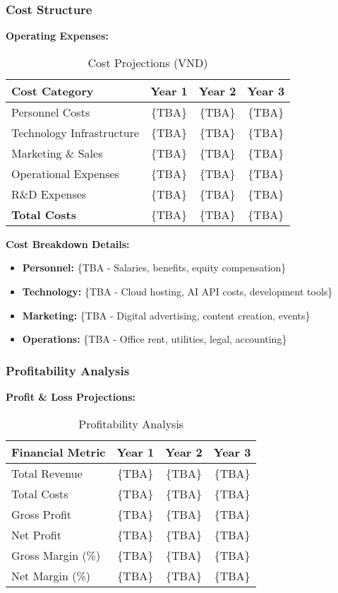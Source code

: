 \subsubsection{Cost Structure}
\textbf{Operating Expenses:}
\begin{table}[h]
\centering
\begin{tabular}{|l|c|c|c|}
\hline
\textbf{Cost Category} & \textbf{Year 1} & \textbf{Year 2} & \textbf{Year 3} \\
\hline
Personnel Costs & \{TBA\} & \{TBA\} & \{TBA\} \\
Technology Infrastructure & \{TBA\} & \{TBA\} & \{TBA\} \\
Marketing \& Sales & \{TBA\} & \{TBA\} & \{TBA\} \\
Operational Expenses & \{TBA\} & \{TBA\} & \{TBA\} \\
R\&D Expenses & \{TBA\} & \{TBA\} & \{TBA\} \\
\hline
\textbf{Total Costs} & \{TBA\} & \{TBA\} & \{TBA\} \\
\hline
\end{tabular}
\caption{Cost Projections (VND)}
\end{table}

\textbf{Cost Breakdown Details:}
\begin{itemize}
    \item \textbf{Personnel:} \{TBA - Salaries, benefits, equity compensation\}
    \item \textbf{Technology:} \{TBA - Cloud hosting, AI API costs, development tools\}
    \item \textbf{Marketing:} \{TBA - Digital advertising, content creation, events\}
    \item \textbf{Operations:} \{TBA - Office rent, utilities, legal, accounting\}
\end{itemize}

\subsubsection{Profitability Analysis}
\textbf{Profit \& Loss Projections:}
\begin{table}[h]
\centering
\begin{tabular}{|l|c|c|c|}
\hline
\textbf{Financial Metric} & \textbf{Year 1} & \textbf{Year 2} & \textbf{Year 3} \\
\hline
Total Revenue & \{TBA\} & \{TBA\} & \{TBA\} \\
Total Costs & \{TBA\} & \{TBA\} & \{TBA\} \\
\hline
Gross Profit & \{TBA\} & \{TBA\} & \{TBA\} \\
Net Profit & \{TBA\} & \{TBA\} & \{TBA\} \\
\hline
Gross Margin (\%) & \{TBA\} & \{TBA\} & \{TBA\} \\
Net Margin (\%) & \{TBA\} & \{TBA\} & \{TBA\} \\
\hline
\end{tabular}
\caption{Profitability Analysis}
\end{table}

